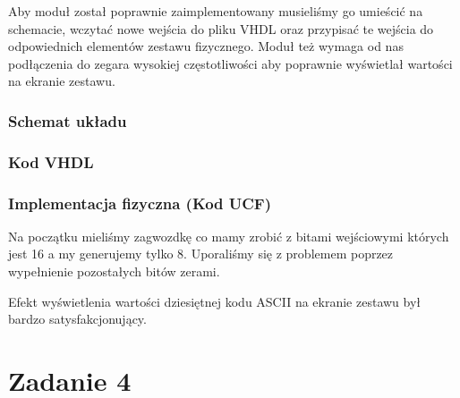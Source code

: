 \documentclass[a4paper,12pt]{extarticle}  %
\begin{document}
Aby moduł został poprawnie zaimplementowany musieliśmy go umieścić na schemacie, wczytać nowe wejścia do pliku VHDL oraz przypisać te wejścia do odpowiednich elementów zestawu fizycznego.
Moduł też wymaga od nas podłączenia do zegara wysokiej częstotliwości aby poprawnie wyświetlał wartości na ekranie zestawu.
\subsubsection{Schemat układu}
\begin{figure}[H]
	\centering
\end{figure}
\subsubsection{Kod VHDL}
% 
\subsubsection{Implementacja fizyczna (Kod UCF)}


Na początku mieliśmy zagwozdkę co mamy zrobić z bitami wejściowymi których jest 16 a my generujemy tylko 8. Uporaliśmy się z problemem poprzez wypełnienie pozostałych bitów zerami.

Efekt wyświetlenia wartości dziesiętnej kodu ASCII na ekranie zestawu był bardzo satysfakcjonujący.
\section{Zadanie 4}
\end{document}
